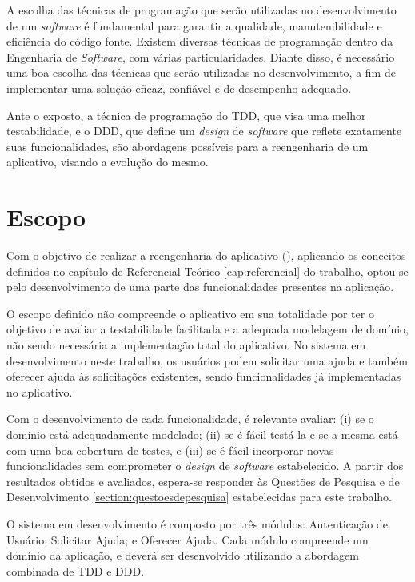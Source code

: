 A escolha das técnicas de programação que serão utilizadas no desenvolvimento de um 
\textit{software} é fundamental para garantir a qualidade, manutenibilidade e eficiência 
do código fonte. Existem diversas técnicas de programação dentro da Engenharia de \textit{Software}, 
com várias particularidades. Diante disso, é necessário uma boa escolha das técnicas que serão 
utilizadas no desenvolvimento, a fim de implementar uma solução eficaz, confiável e de desempenho 
adequado.

Ante o exposto, a técnica de programação do TDD, que visa uma melhor testabilidade, e o DDD, que define um 
\textit{design} de \textit{software} que reflete exatamente suas funcionalidades, são abordagens possíveis 
para a reengenharia de um aplicativo, visando a evolução do mesmo.


\section{Escopo}
\label{section:escopo}

Com o objetivo de realizar a reengenharia do aplicativo  (\citeyear{MiaAjuda}), aplicando os conceitos definidos 
no capítulo de Referencial Teórico \ref{cap:referencial} do trabalho, optou-se pelo desenvolvimento de uma parte 
das funcionalidades presentes na aplicação.

O escopo definido não compreende o aplicativo em sua totalidade por ter o objetivo de avaliar 
a testabilidade facilitada e a adequada modelagem de domínio, não sendo necessária a implementação total do 
aplicativo. No sistema em desenvolvimento neste trabalho, os usuários podem solicitar uma ajuda e também oferecer 
ajuda às solicitações existentes, sendo funcionalidades já implementadas no aplicativo.

Com o desenvolvimento de cada funcionalidade, é relevante avaliar: (i) se o domínio está adequadamente 
modelado; (ii) se é fácil testá-la e se a mesma está com uma boa cobertura de testes, e (iii) se é fácil 
incorporar novas funcionalidades sem comprometer o \textit{design} de \textit{software} estabelecido. A 
partir dos resultados obtidos e avaliados, espera-se responder às Questões de Pesquisa e de Desenvolvimento \ref{section:questoesdepesquisa}  
estabelecidas para este trabalho.

O sistema em desenvolvimento é composto por três módulos: Autenticação de Usuário; Solicitar Ajuda; 
e Oferecer Ajuda. Cada módulo compreende um domínio da aplicação, e deverá ser desenvolvido utilizando 
a abordagem combinada de TDD e DDD.


